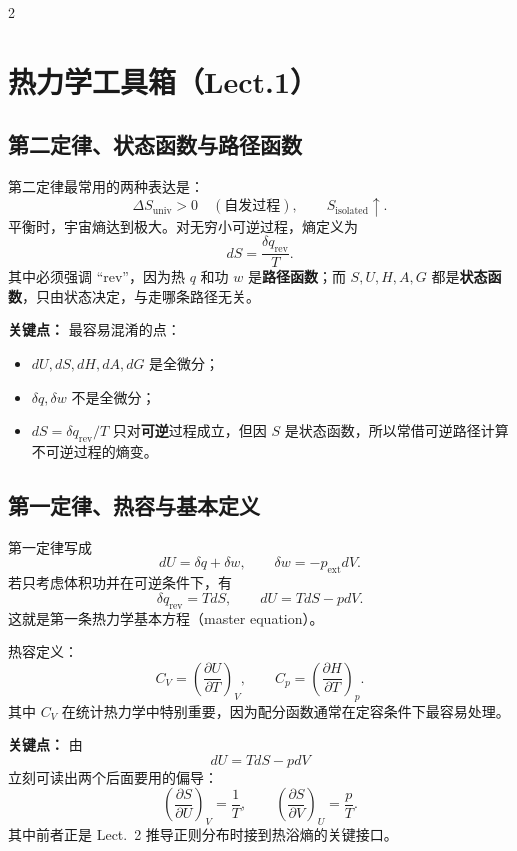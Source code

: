 \documentclass[a4paper,9pt]{article}
\newenvironment{keypoint}
{\par\vspace{0.3em}\noindent\begin{tcolorbox}[
  colback=keybg,
  colframe=keycolor,
  boxrule=0.5pt,
  arc=2pt,
  left=2pt,
  right=2pt,
  top=2pt,
  bottom=2pt,
  boxsep=0pt,
  ]
\noindent\textcolor{keycolor}{\textbf{关键点：}}}
{\end{tcolorbox}\par\vspace{0.3em}}
\begin{document}
\begin{multicols}{2}
	\section{热力学工具箱（Lect.1）}

	\subsection{第二定律、状态函数与路径函数}
	第二定律最常用的两种表达是：
	\[
		\Delta S_{\mathrm{univ}}>0 \quad (\text{自发过程}),
		\qquad
		S_{\mathrm{isolated}}\uparrow.
	\]
	平衡时，宇宙熵达到极大。对无穷小可逆过程，熵定义为
	\[
		dS=\frac{\delta q_{\mathrm{rev}}}{T}.
	\]
	其中必须强调 ``rev''，因为热 $q$ 和功 $w$ 是\textbf{路径函数}；而 $S,U,H,A,G$ 都是\textbf{状态函数}，只由状态决定，与走哪条路径无关。

	\begin{keypoint}
		最容易混淆的点：
		\begin{itemize}
			\item $dU,dS,dH,dA,dG$ 是全微分；
			\item $\delta q,\delta w$ 不是全微分；
			\item $dS=\delta q_{\mathrm{rev}}/T$ 只对\textbf{可逆}过程成立，但因 $S$ 是状态函数，所以常借可逆路径计算不可逆过程的熵变。
		\end{itemize}
	\end{keypoint}

	\subsection{第一定律、热容与基本定义}
	第一定律写成
	\[
		dU=\delta q+\delta w,
		\qquad
		\delta w=-p_{\mathrm{ext}}dV.
	\]
	若只考虑体积功并在可逆条件下，有
	\[
		\delta q_{\mathrm{rev}}=TdS,
		\qquad
		dU=TdS-pdV.
	\]
	这就是第一条热力学基本方程（master equation）。

	热容定义：
	\[
		C_V=\left(\frac{\partial U}{\partial T}\right)_V,
		\qquad
		C_p=\left(\frac{\partial H}{\partial T}\right)_p.
	\]
	其中 $C_V$ 在统计热力学中特别重要，因为配分函数通常在定容条件下最容易处理。

	\begin{keypoint}
		由
		\[
			dU=TdS-pdV
		\]
		立刻可读出两个后面要用的偏导：
		\[
			\left(\frac{\partial S}{\partial U}\right)_V=\frac1T,
			\qquad
			\left(\frac{\partial S}{\partial V}\right)_U=\frac pT.
		\]
		其中前者正是 Lect.~2 推导正则分布时接到热浴熵的关键接口。
	\end{keypoint}


\end{multicols}
\end{document}
